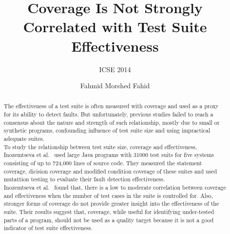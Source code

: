 \documentclass[sigconf]{acmart}
\begin{document}
\title{Coverage Is Not Strongly Correlated with Test Suite Effectiveness}
\subtitle{ICSE 2014}


\author{Fahmid Morshed Fahid}

\begin{abstract}
The effectiveness of a test suite is often measured with coverage and used as a proxy for its ability to detect faults. But unfortunately, previous studies failed to reach a consensus about the nature and strength of such relationship, mostly due to small or synthetic programs, confounding influence of test suite size and using impractical adequate suites.\\
To study the relationship between test suite size, coverage and effectiveness, Inozemtseva et al.~\cite{inozemtseva2014coverage} used large Java programs with 31000 test suits for five systems consisting of up to 724,000 lines of source code. They measured the statement coverage, dicision coverage and modified condition coverage of these suites and used mutattion testing to evaluate their fault detection effectiveness.\\
Inozemtseva et al.~\cite{inozemtseva2014coverage} found that, there is a low to moderate correlation between coverage and effectiveness when the number of test cases in the suite is controlled for. Also, stronger forms of coverage do not provide greater insight into the effectiveness of the suite. Their results suggest that, coverage, while useful for identifying under-tested parts of a program, should not be used as a quality target because it is not a good indicator of test suite effectiveness.



\end{abstract}


\maketitle




%



\end{document}
